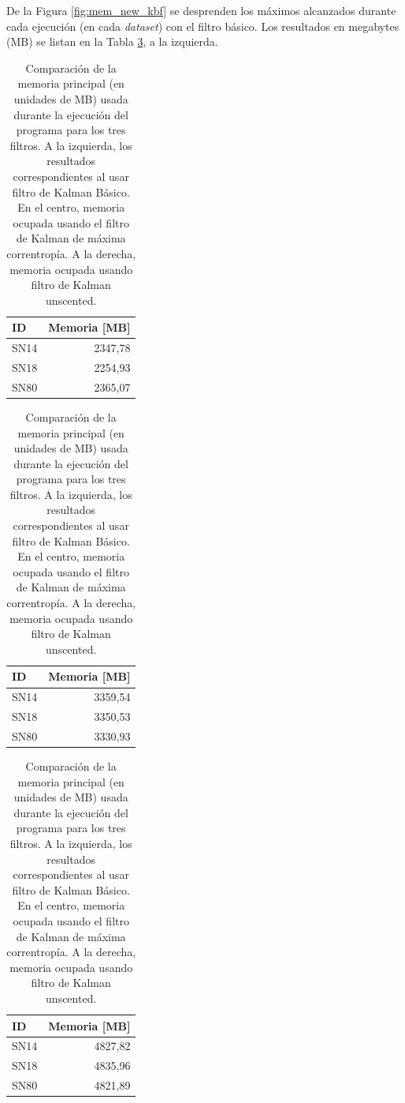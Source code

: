 De la Figura \ref{fig:mem_new_kbf} se desprenden los m\'aximos alcanzados durante cada ejecuci\'on (en cada \textit{dataset}) con el filtro b\'asico. Los resultados en megabytes (MB) se listan en la Tabla \ref{tab:mem3}, a la izquierda.
\pagebreak

\begin{table}
        
\caption{Comparaci\'on de la memoria principal (en unidades de MB) usada durante la ejecuci\'on del programa para los tres filtros. A la izquierda, los resultados correspondientes al usar filtro de Kalman B\'asico. En el centro, memoria ocupada usando el filtro de Kalman de m\'axima correntrop\'ia. A la derecha, memoria ocupada usando filtro de Kalman unscented.}
            \footnotesize
\begin{tabular}{|l|r|}
\hline
\textbf{ID} & Memoria [MB]\\\hline\hline
SN14 & 2347,78\\\hline
SN18 & 2254,93\\\hline
SN80 & 2365,07\\\hline
\end{tabular}
                \hfill
\begin{tabular}{|l|r|}

\hline
\textbf{ID} & Memoria [MB]\\\hline\hline
SN14 & 3359,54\\\hline
SN18 & 3350,53\\\hline
SN80 & 3330,93\\\hline
\end{tabular}
                \hfill
\begin{tabular}{|l|r|}

\hline
\textbf{ID} & Memoria [MB]\\\hline\hline
SN14 & 4827,82\\\hline
SN18 & 4835,96\\\hline
SN80 & 4821,89\\\hline
\end{tabular}
                \label{tab:mem3}
            \end{table}



